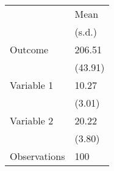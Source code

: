 \begin{tabular}{ll}
\toprule
{} &     Mean \\
{} &   (s.d.) \\
\midrule
Outcome      &   206.51 \\
             &  (43.91) \\
Variable 1   &    10.27 \\
             &   (3.01) \\
Variable 2   &    20.22 \\
             &   (3.80) \\
Observations &      100 \\
\bottomrule
\end{tabular}
